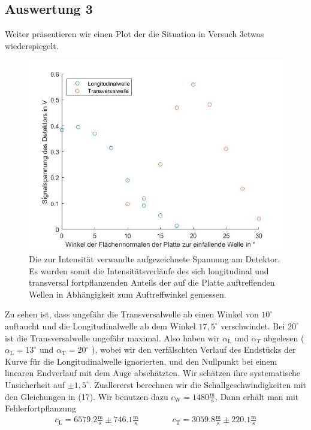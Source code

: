 \documentclass[a4paper, 12pt]{scrartcl}
\begin{document}
\subsection{Auswertung 3}
Weiter präsentieren wir einen Plot der die Situation in \glqq Versuch 3\grqq \space etwas wiederspiegelt. 
\begin{figure}[H]\includegraphics[scale=0.6]{Schallwellen durch Platte}\caption{Die zur Intensität verwandte aufgezeichnete Spannung am Detektor. Es wurden somit die Intensitätsverläufe des sich longitudinal und transversal fortpflanzenden Anteils der auf die Platte auftreffenden Wellen in Abhängigkeit zum Auftreffwinkel gemessen.}\end{figure}
Zu sehen ist, dass ungefähr die Transversalwelle ab einen Winkel von $10^\circ$ auftaucht und die Longitudinalwelle ab dem Winkel $17,5^\circ$ verschwindet. Bei $20^\circ$ ist die Transversalwelle ungefähr maximal. Also haben wir $\alpha_\textrm{L}$ und $\alpha_{T}$ abgelesen ( $\alpha_\textrm{L} = 13^\circ$ und $\alpha_\textrm{T}= 20^\circ$ ), wobei wir den verfälschten Verlauf des Endstücks der Kurve für die Longitudinalwelle ignorierten, und den Nullpunkt bei einem linearen Endverlauf mit dem Auge abschätzten. Wir schätzen ihre systematische Unsicherheit auf $\pm 1,5^\circ$. Zuallererst berechnen wir die Schallgeschwindigkeiten mit den Gleichungen in (17). Wir benutzen dazu $c_\textrm{W}=1480\frac{\textrm{m}}{\textrm{s}}$. Dann erhält man mit Fehlerfortpflanzung
\begin{align*}
c_\textrm{L} = 6579.2 \frac{\textrm{m}}{\textrm{s}} \pm 746.1 \frac{\textrm{m}}{\textrm{s}} \qquad \qquad c_\textrm{T} = 3059.8  \frac{\textrm{m}}{\textrm{s}} \pm 220.1 \frac{\textrm{m}}{\textrm{s}}
\end{align*}
\end{document}
